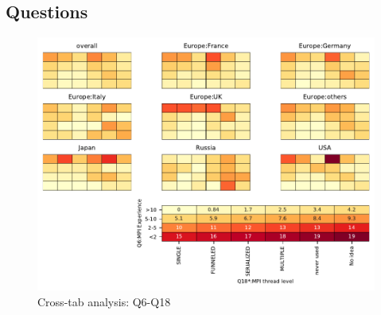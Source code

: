 
\subsection{Questions}


\begin{figure}
\begin{center}
\includegraphics[width=12cm]{../pdfs/Q6-Q18.pdf}
\caption{Cross-tab analysis: Q6-Q18}
\label{fig:Q6-Q18}
\end{center}
\end{figure}
